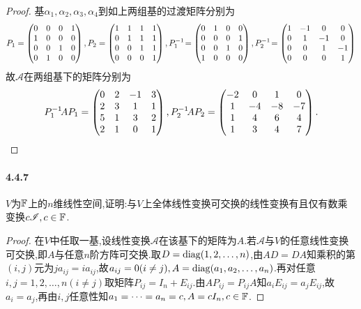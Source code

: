 \documentclass[11pt]{article}
\begin{document}
\begin{proof}
    基$\alpha_1,\alpha_2,\alpha_3,\alpha_4$到如上两组基的过渡矩阵分别为
    $$P_1=\begin{pmatrix}
        0 & 0 & 0 & 1 \\
        1 & 0 & 0 & 0 \\
        0 & 0 & 1 & 0 \\
        0 & 1 & 0 & 0 \\
    \end{pmatrix}, P_2=\begin{pmatrix}
        1 & 1 & 1 & 1 \\
        0 & 1 & 1 & 1 \\
        0 & 0 & 1 & 1 \\
        0 & 0 & 0 & 1 \\
    \end{pmatrix}, P_1^{-1}\!=\begin{pmatrix}
        0 & 1 & 0 & 0 \\
        0 & 0 & 0 & 1 \\
        0 & 0 & 1 & 0 \\
        1 & 0 & 0 & 0 \\
    \end{pmatrix},P_2^{-1}\!=\begin{pmatrix}
        1 & -1 & 0 & 0 \\
        0 & 1 & -1 & 0 \\
        0 & 0 & 1 & -1 \\
        0 & 0 & 0 & 1 \\
    \end{pmatrix}$$
    故$\mathscr{A}$在两组基下的矩阵分别为
    $$P_1^{-1}\! A P_1=\begin{pmatrix}
        0 & 2 & -1 & 3 \\
        2 & 3 & 1 & 1 \\
        5 & 1 & 3 & 2 \\
        2 & 1 & 0 & 1 \\
    \end{pmatrix}, P_2^{-1}\! A P_2=\begin{pmatrix}
        -2 & 0 & 1 & 0 \\
        1 & -4 & -8 & -7 \\
        1 & 4 & 6 & 4 \\
        1 & 3 & 4 & 7 \\
    \end{pmatrix}.$$
\end{proof}
\paragraph{4.4.7}$V$为$\mathbb{F}$上的$n$维线性空间,证明:与$V$上全体线性变换可交换的线性变换有且仅有数乘变换$c\mathscr{I}, c\in\mathbb{F}$.
\begin{proof}
    在$V$中任取一基,设线性变换$\mathscr{A}$在该基下的矩阵为$A$.若$\mathscr{A}$与$V$的任意线性变换可交换,即$A$与任意$n$阶方阵可交换.取$D=\operatorname{diag}(1,2,\dots,n)$,由$AD=DA$知乘积的第$(i,j)$元为$ja_{ij}=ia_{ij}$,故$a_{ij}=0 (i\neq j), A=\operatorname{diag}(a_{1},a_{2},\dots,a_{n})$.再对任意$i,j=1,2,\dots,n (i\neq j)$取矩阵$P_{ij}=I_n+E_{ij}$.由$AP_{ij}=P_{ij}A$知$a_i E_{ij}=a_j E_{ij}$,故$a_i=a_j$,再由$i,j$任意性知$a_1=\dots=a_n=c, A=cI_n, c\in \mathbb{F}$.
\end{proof}
\end{document}
